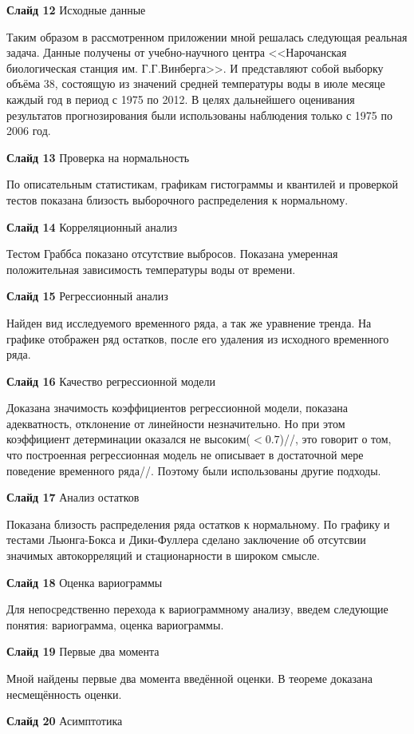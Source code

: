 \documentclass[a4paper,10pt]{report}
\begin{document}
\textbf{Слайд 12} Исходные данные

Таким образом в рассмотренном приложении мной решалась следующая реальная задача. Данные получены от учебно-научного центра <<Нарочанская биологическая станция им. Г.Г.Винберга>>. И представляют собой выборку объёма 38, состоящую из значений средней температуры воды в июле месяце каждый год в период с 1975 по 2012. В целях дальнейшего оценивания результатов прогнозирования были использованы наблюдения только с 1975 по 2006 год.

\textbf{Слайд 13} Проверка на нормальность

По описательным статистикам, графикам гистограммы и квантилей и проверкой тестов показана близость выборочного распределения к нормальному.

\textbf{Слайд 14} Корреляционный анализ

Тестом Граббса показано отсутствие выбросов. Показана умеренная положительная зависимость температуры воды от времени.

\textbf{Слайд 15} Регрессионный анализ

Найден вид исследуемого временного ряда, а так же уравнение тренда. На графике отображен ряд остатков, после его удаления из исходного временного ряда.

\textbf{Слайд 16} Качество регрессионной модели

Доказана значимость коэффициентов регрессионной модели, показана адекватность, отклонение от линейности незначительно. Но при этом коэффициент детерминации оказался не высоким($<0.7$)//, это говорит о том, что построенная регрессионная модель не описывает в достаточной мере поведение временного ряда//. Поэтому были использованы другие подходы.

\textbf{Слайд 17} Анализ остатков

Показана близость распределения ряда остатков к нормальному. По графику и тестами Льюнга-Бокса и Дики-Фуллера сделано заключение об отсутсвии значимых автокорреляций и стационарности в широком смысле.

\textbf{Слайд 18} Оценка вариограммы

Для непосредственно перехода к вариограммному анализу, введем следующие понятия: вариограмма, оценка вариограммы.

\textbf{Слайд 19} Первые два момента

Мной найдены первые два момента введённой оценки. В теореме доказана несмещённость оценки.

\textbf{Слайд 20} Асимптотика
\end{document}
